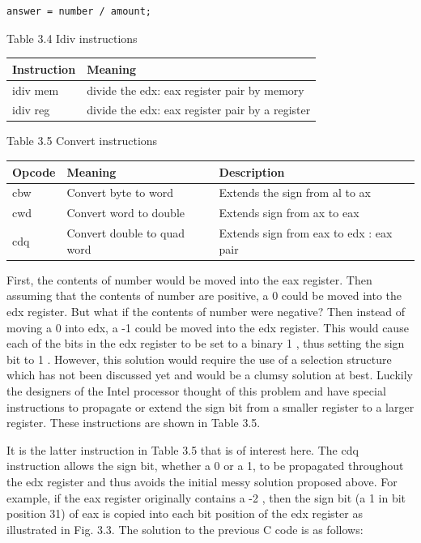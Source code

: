 \documentclass[10pt]{book}
\begin{document}
\begin{verbatim}
answer = number / amount;
\end{verbatim}

Table 3.4 Idiv instructions

\begin{center}
\begin{tabular}{|l|l|}
\hline
Instruction & Meaning \\
\hline
idiv mem & divide the edx: eax register pair by memory \\
\hline
idiv reg & divide the edx: eax register pair by a register \\
\hline
\end{tabular}
\end{center}

Table 3.5 Convert instructions

\begin{center}
\begin{tabular}{|l|l|l|}
\hline
Opcode & Meaning & Description \\

\hline
cbw & Convert byte to word & Extends the sign from al to ax \\
\hline
cwd & Convert word to double & Extends sign from ax to eax \\
\hline
cdq & Convert double to quad word & Extends sign from eax to edx : eax pair \\
\hline
\end{tabular}
\end{center}

First, the contents of number would be moved into the eax register. Then assuming that the contents of number are positive, a 0 could be moved into the edx register. But what if the contents of number were negative? Then instead of moving a 0 into edx, a -1 could be moved into the edx register. This would cause each of the bits in the edx register to be set to a binary 1 , thus setting the sign bit to 1 . However, this solution would require the use of a selection structure which has not been discussed yet and would be a clumsy solution at best. Luckily the designers of the Intel processor thought of this problem and have special instructions to propagate or extend the sign bit from a smaller register to a larger register. These instructions are shown in Table 3.5.

It is the latter instruction in Table 3.5 that is of interest here. The cdq instruction allows the sign bit, whether a 0 or a 1, to be propagated throughout the edx register and thus avoids the initial messy solution proposed above. For example, if the eax register originally contains a -2 , then the sign bit (a 1 in bit position 31) of eax is copied into each bit position of the edx register as illustrated in Fig. 3.3. The solution to the previous C code is as follows:
\end{document}
